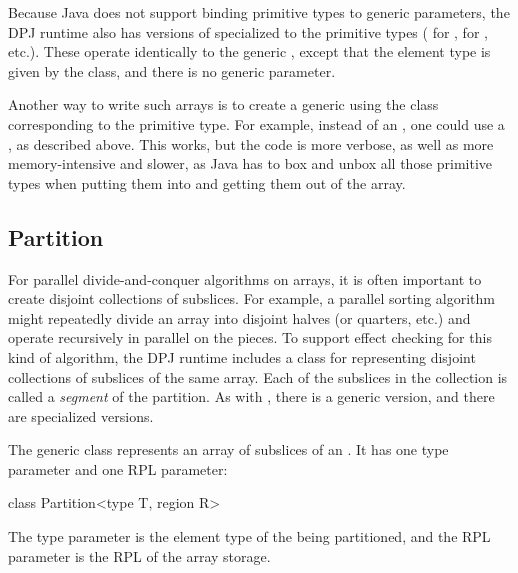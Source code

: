  Because Java does not support
binding primitive types to generic parameters, the DPJ runtime also
has versions of  specialized to the primitive types
( for ,  for ,
etc.).  These operate identically to the generic ,
except that the element type is given by the class, and there is no
generic parameter.

Another way to write such arrays is to create a generic 
using the class corresponding to the primitive type.  For example,
instead of an , one could use a
, as described above.  This works, but the code
is more verbose, as well as more memory-intensive and slower, as Java
has to box and unbox all those primitive types when putting them into
and getting them out of the array.


\subsection{Partition%
\label{sec:runtime:partition}}

For parallel divide-and-conquer algorithms on arrays, it is often
important to create disjoint collections of subslices.  For example, a
parallel sorting algorithm might repeatedly divide an array into
disjoint halves (or quarters, etc.) and operate recursively in
parallel on the pieces.  To support effect checking for this kind of
algorithm, the DPJ runtime includes a class  for
representing disjoint collections of subslices of the same array.
Each of the subslices in the collection is called a \emph{segment} of
the partition.  As with , there is a generic version,
and there are specialized versions.

  The generic 
class represents an array of subslices of an .  It has
one type parameter and one RPL parameter:
%
\begin{dpjlisting}
class Partition<type T, region R>
\end{dpjlisting}
%
The type parameter is the element type of the  being
partitioned, and the RPL parameter is the RPL of the array storage.

